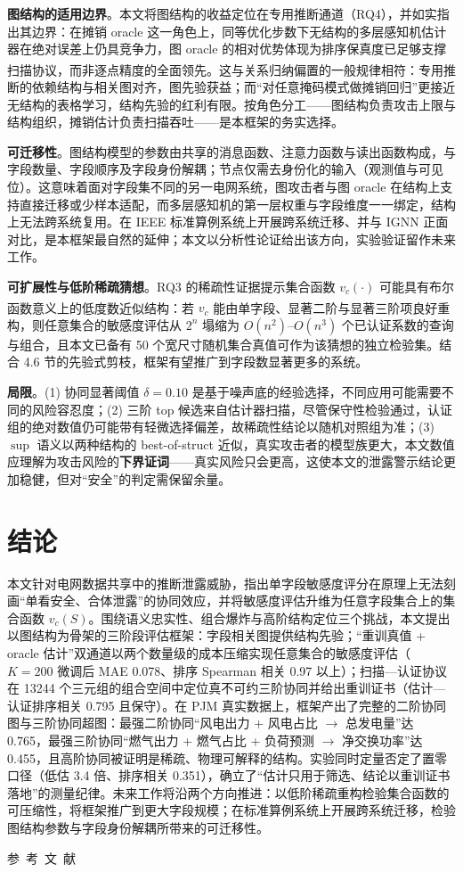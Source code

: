 \documentclass[10.5pt,compsoc,UTF8]{CjC}
\theoremstyle{mystyle}
\newcommand{\upcite}[1]{\textsuperscript{\cite{#1}}}
\begin{document}
\textbf{图结构的适用边界}。本文将图结构的收益定位在专用推断通道（RQ4），并如实指出其边界：在摊销 oracle 这一角色上，同等优化步数下无结构的多层感知机估计器在绝对误差上仍具竞争力，图 oracle 的相对优势体现为排序保真度已足够支撑扫描协议，而非逐点精度的全面领先。这与关系归纳偏置的一般规律相符\upcite{battaglia2018relational,grinsztajn2022tabular}：专用推断的依赖结构与相关图对齐，图先验获益；而“对任意掩码模式做摊销回归”更接近无结构的表格学习，结构先验的红利有限。按角色分工——图结构负责攻击上限与结构组织，摊销估计负责扫描吞吐——是本框架的务实选择。

\textbf{可迁移性}。图结构模型的参数由共享的消息函数、注意力函数与读出函数构成，与字段数量、字段顺序及字段身份解耦；节点仅需去身份化的输入（观测值与可见位）。这意味着面对字段集不同的另一电网系统，图攻击者与图 oracle 在结构上支持直接迁移或少样本适配，而多层感知机的第一层权重与字段维度一一绑定，结构上无法跨系统复用。在 IEEE 标准算例系统上开展跨系统迁移、并与 IGNN 正面对比，是本框架最自然的延伸；本文以分析性论证给出该方向，实验验证留作未来工作。

\textbf{可扩展性与低阶稀疏猜想}。RQ3 的稀疏性证据提示集合函数 $v_c(\cdot)$ 可能具有布尔函数意义上的低度数近似结构\upcite{odonnell2014boolean}：若 $v_c$ 能由单字段、显著二阶与显著三阶项良好重构，则任意集合的敏感度评估从 $2^n$ 塌缩为 $O(n^2)$--$O(n^3)$ 个已认证系数的查询与组合，且本文已备有 50 个宽尺寸随机集合真值可作为该猜想的独立检验集。结合 4.6 节的先验式剪枝，框架有望推广到字段数显著更多的系统。

\textbf{局限}。(1) 协同显著阈值 $\delta=0.10$ 是基于噪声底的经验选择，不同应用可能需要不同的风险容忍度；(2) 三阶 top 候选来自估计器扫描，尽管保守性检验通过，认证组的绝对数值仍可能带有轻微选择偏差，故稀疏性结论以随机对照组为准；(3) $\sup$ 语义以两种结构的 best-of-struct 近似，真实攻击者的模型族更大，本文数值应理解为攻击风险的\textbf{下界证词}——真实风险只会更高，这使本文的泄露警示结论更加稳健，但对“安全”的判定需保留余量。

\section{\heiti 结论}

本文针对电网数据共享中的推断泄露威胁，指出单字段敏感度评分在原理上无法刻画“单看安全、合体泄露”的协同效应，并将敏感度评估升维为任意字段集合上的集合函数 $v_c(S)$。围绕语义忠实性、组合爆炸与高阶结构定位三个挑战，本文提出以图结构为骨架的三阶段评估框架：字段相关图提供结构先验；“重训真值 + oracle 估计”双通道以两个数量级的成本压缩实现任意集合的敏感度评估（$K{=}200$ 微调后 MAE 0.078、排序 Spearman 相关 0.97 以上）；扫描—认证协议在 13244 个三元组的组合空间中定位真不可约三阶协同并给出重训证书（估计—认证排序相关 0.795 且保守）。在 PJM 真实数据上，框架产出了完整的二阶协同图与三阶协同超图：最强二阶协同“风电出力 + 风电占比 $\to$ 总发电量”达 0.765，最强三阶协同“燃气出力 + 燃气占比 + 负荷预测 $\to$ 净交换功率”达 0.455，且高阶协同被证明是稀疏、物理可解释的结构。实验同时定量否定了置零口径（低估 3.4 倍、排序相关 0.351），确立了“估计只用于筛选、结论以重训证书落地”的测量纪律。未来工作将沿两个方向推进：以低阶稀疏重构检验集合函数的可压缩性，将框架推广到更大字段规模；在标准算例系统上开展跨系统迁移，检验图结构参数与字段身份解耦所带来的可迁移性。

\vspace {10mm}
\centerline
{\textsf{参~考~文~献}}
 \addtolength{\itemsep}{-1em}
\vspace {1.5mm}


\end{document}
